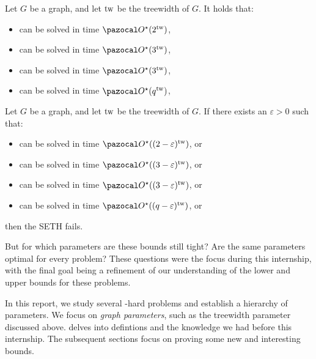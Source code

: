 \begin{theorem}
    \label{theorem:treewidth-algo}
    Let $G$ be a graph, and let $\text{tw}$ be the treewidth of $G$. It holds that:
    \begin{itemize}
        \item {} can be solved in time $\O^\star(2^{\tw})$,
        \item {} can be solved in time $\O^\star(3^{\tw})$,
        \item {} can be solved in time $\O^\star(3^{\tw})$,
        \item {} can be solved in time $\O^\star(q^{\tw})$,
    \end{itemize}
\end{theorem}

\begin{theorem}
    \label{theorem:treewidth-bound}
    Let $G$ be a graph, and let $\text{tw}$ be the treewidth of $G$. If there exists an $\varepsilon > 0$ such that:
    \begin{itemize}
        \item {} can be solved in time $\O^\star((2-\varepsilon)^{\tw})$, or
        \item {} can be solved in time $\O^\star((3-\varepsilon)^{\tw})$, or
        \item {} can be solved in time $\O^\star((3-\varepsilon)^{\tw})$, or
        \item {} can be solved in time $\O^\star((q-\varepsilon)^{\tw})$, or
    \end{itemize}
    then the SETH fails.
\end{theorem}

But for which parameters are these bounds still tight? Are the same parameters optimal for every problem? These questions were the focus during this internship, with the final goal being a refinement of our understanding of the lower and upper bounds for these problems.

In this report, we study several \NP-hard problems and establish a hierarchy of parameters. We focus on \textit{graph parameters}, such as the treewidth parameter discussed above.  delves into defintions and the knowledge we had before this internship. The subsequent sections focus on proving some new and interesting bounds.